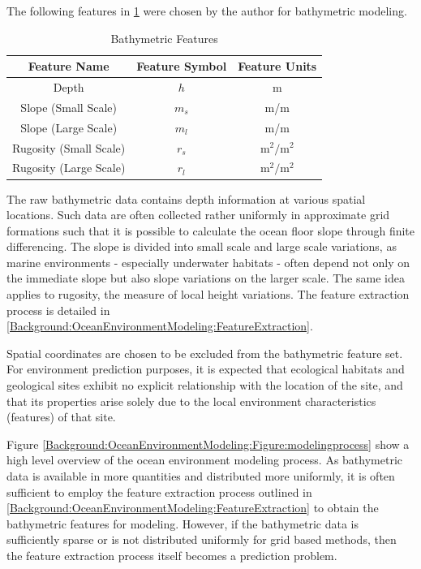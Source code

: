 		The following features in \cref{Background:OceanEnvironmentModeling:Table:Features} were chosen by the author for bathymetric modeling. 

		\begin{table}[h]
			\begin{center}
				\begin{tabular}{ |c|c|c| }
					\hline
					Feature Name & Feature Symbol & Feature Units \\
					\hline
					Depth & $h$ & m \\
					Slope (Small Scale) & $m_{s}$ & m/m \\
					Slope (Large Scale) & $m_{l}$& m/m \\
					Rugosity (Small Scale) & $r_{s}$ & $\mathrm{m^{2}/m^{2}}$ \\
					Rugosity (Large Scale) & $r_{l}$ & $\mathrm{m^{2}/m^{2}}$  \\
					\hline
				\end{tabular}
			\end{center}
	  	\caption{Bathymetric Features}
	  	\label{Background:OceanEnvironmentModeling:Table:Features}			
	  	\end{table}	
		
		The raw bathymetric data contains depth information at various spatial locations. Such data are often collected rather uniformly in approximate grid formations such that it is possible to calculate the ocean floor slope through finite differencing. The slope is divided into small scale and large scale variations, as marine environments - especially underwater habitats - often depend not only on the immediate slope but also slope variations on the larger scale. The same idea applies to rugosity, the measure of local height variations. The feature extraction process is detailed in \cref{Background:OceanEnvironmentModeling:FeatureExtraction}. 
		  
		Spatial coordinates are chosen to be excluded from the bathymetric feature set. For environment prediction purposes, it is expected that ecological habitats and geological sites exhibit no explicit relationship with the location of the site, and that its properties arise solely due to the local environment characteristics (features) of that site.
		
		\FloatBarrier			
		
		Figure \ref{Background:OceanEnvironmentModeling:Figure:modelingprocess} show a high level overview of the ocean environment modeling process. As bathymetric data is available in more quantities and distributed more uniformly, it is often sufficient to employ the feature extraction process outlined in \cref{Background:OceanEnvironmentModeling:FeatureExtraction} to obtain the bathymetric features for modeling. However, if the bathymetric data is sufficiently sparse or is not distributed uniformly for grid based methods, then the feature extraction process itself becomes a prediction problem.


